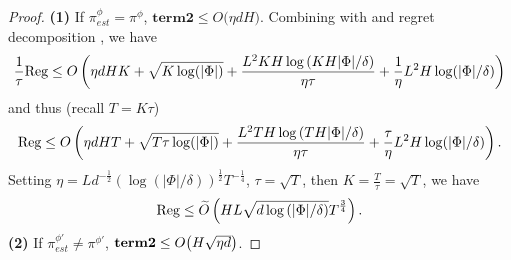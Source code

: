 \begin{proof}
\textbf{(1)} If $\pi^{\phi}_{est} = \pi^{\phi}$, $\textbf{term2} \le O\big(\eta dH\big)$. Combining with  and regret decomposition , we have 
\begin{align*}
    \frac{1}{\tau}\text{\rmfamily Reg} \le O\left(\eta dHK + \sqrt{K\log(|\Phi|)} + \frac{ L^2KH\log\left(KH|\Phi|/\delta\right)}{\eta\tau} +  \frac{1}{\eta} L^2 H\log(|\Phi|/\delta)\right)
\end{align*}
and thus (recall $T=K\tau$)
\begin{align*}
    \text{\rmfamily Reg} \le O\left(\eta dHT + \sqrt{T\tau\log(|\Phi|)} + \frac{ L^2TH\log\left(TH|\Phi|/\delta\right)}{\eta\tau} +  \frac{\tau}{\eta} L^2 H\log(|\Phi|/\delta)\right).
\end{align*}
Setting $\eta =  Ld^{-\frac{1}{2}} (\log(|\Phi|/\delta))^{\frac{1}{2}} T^{-\frac{1}{4}}$, $\tau = \sqrt{T}$, then $K = \frac{T}{\tau} = \sqrt{T}$, we have
\begin{align*}
    \text{\rmfamily Reg} \le \widetilde{O}\left( HL\sqrt{d \log\left(|\Phi|/\delta\right)} T^{\frac{3}{4}}\right). 
\end{align*}
\textbf{(2)} If $\pi^{\phi'}_{est} \neq \pi^{\phi'}$, $\textbf{term2} \le O\big(H\sqrt{\eta d}\big)$. 

\end{proof}
